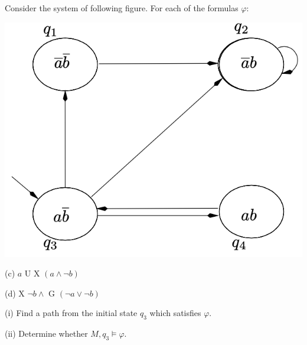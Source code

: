 Consider the system of following figure. For each of the formulas $\varphi$: 
\begin{center}
    \includegraphics[scale=0.5]{Details/p1.png}
\end{center}

(c) $a\textrm{ U X }(a\wedge \neg b)$

(d) $\textrm{X }\neg b \wedge \textrm{ G }(\neg a\vee \neg b)$

(i) Find a path from the initial state $q_3$ which satisfies $\varphi$.

(ii) Determine whether $M, q_3 \models \varphi$.